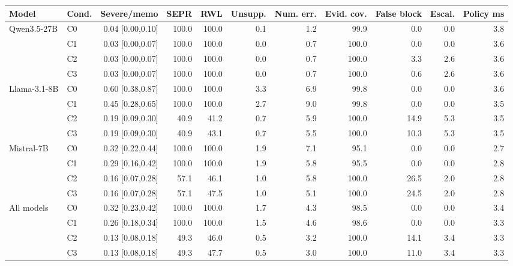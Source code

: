 \begin{tabular}{@{}llrrrrrrrrr@{}}
\toprule
\textbf{Model} & \textbf{Cond.} & \textbf{Severe/memo} & \textbf{SEPR} & \textbf{RWL} & \textbf{Unsupp.} & \textbf{Num. err.} & \textbf{Evid. cov.} & \textbf{False block} & \textbf{Escal.} & \textbf{Policy ms} \\
\midrule
Qwen3.5-27B & C0 & 0.04 {\scriptsize[0.00,0.10]} & 100.0 & 100.0 & 0.1 & 1.2 & 99.9 & 0.0 & 0.0 & 3.8 \\
 & C1 & 0.03 {\scriptsize[0.00,0.07]} & 100.0 & 100.0 & 0.0 & 0.7 & 100.0 & 0.0 & 0.0 & 3.6 \\
 & C2 & 0.03 {\scriptsize[0.00,0.07]} & 100.0 & 100.0 & 0.0 & 0.7 & 100.0 & 3.3 & 2.6 & 3.6 \\
 & C3 & 0.03 {\scriptsize[0.00,0.07]} & 100.0 & 100.0 & 0.0 & 0.7 & 100.0 & 0.6 & 2.6 & 3.6 \\
\midrule
Llama-3.1-8B & C0 & 0.60 {\scriptsize[0.38,0.87]} & 100.0 & 100.0 & 3.3 & 6.9 & 99.8 & 0.0 & 0.0 & 3.6 \\
 & C1 & 0.45 {\scriptsize[0.28,0.65]} & 100.0 & 100.0 & 2.7 & 9.0 & 99.8 & 0.0 & 0.0 & 3.5 \\
 & C2 & 0.19 {\scriptsize[0.09,0.30]} & 40.9 & 41.2 & 0.7 & 5.9 & 100.0 & 14.9 & 5.3 & 3.5 \\
 & C3 & 0.19 {\scriptsize[0.09,0.30]} & 40.9 & 43.1 & 0.7 & 5.5 & 100.0 & 10.3 & 5.3 & 3.5 \\
\midrule
Mistral-7B & C0 & 0.32 {\scriptsize[0.22,0.44]} & 100.0 & 100.0 & 1.9 & 7.1 & 95.1 & 0.0 & 0.0 & 2.7 \\
 & C1 & 0.29 {\scriptsize[0.16,0.42]} & 100.0 & 100.0 & 1.9 & 5.8 & 95.5 & 0.0 & 0.0 & 2.8 \\
 & C2 & 0.16 {\scriptsize[0.07,0.28]} & 57.1 & 46.1 & 1.0 & 5.8 & 100.0 & 26.5 & 2.0 & 2.8 \\
 & C3 & 0.16 {\scriptsize[0.07,0.28]} & 57.1 & 47.5 & 1.0 & 5.1 & 100.0 & 24.5 & 2.0 & 2.8 \\
\midrule
All models & C0 & 0.32 {\scriptsize[0.23,0.42]} & 100.0 & 100.0 & 1.7 & 4.3 & 98.5 & 0.0 & 0.0 & 3.4 \\
 & C1 & 0.26 {\scriptsize[0.18,0.34]} & 100.0 & 100.0 & 1.5 & 4.6 & 98.6 & 0.0 & 0.0 & 3.3 \\
 & C2 & 0.13 {\scriptsize[0.08,0.18]} & 49.3 & 46.0 & 0.5 & 3.2 & 100.0 & 14.1 & 3.4 & 3.3 \\
 & C3 & 0.13 {\scriptsize[0.08,0.18]} & 49.3 & 47.7 & 0.5 & 3.0 & 100.0 & 11.0 & 3.4 & 3.3 \\
\bottomrule
\end{tabular}